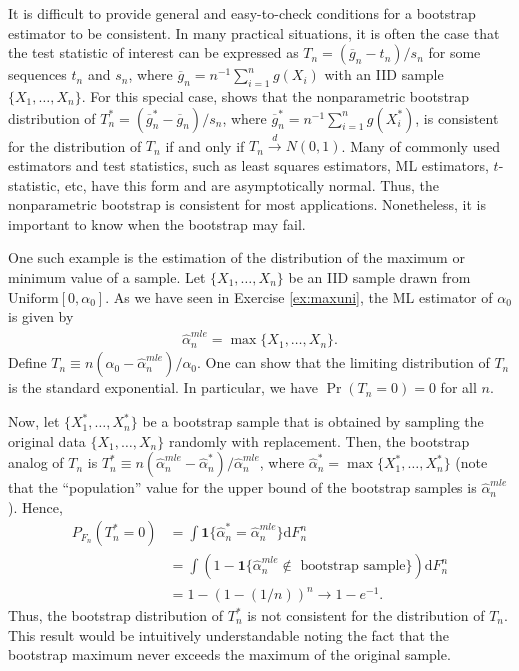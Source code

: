 \documentclass[10.5pt, A4paper, openany, uplatex]{book}
\newcommand{\mbf}{\mathbf}
\renewcommand{\hat}{\widehat}
\renewcommand{\bar}{\overline}
\numberwithin{equation}{section}
\begin{document}
It is difficult to provide general and easy-to-check conditions for a bootstrap estimator to be consistent.
In many practical situations, it is often the case that the test statistic of interest can be expressed as $T_n = (\bar g_n - t_n)/s_n$ for some sequences $t_n$ and $s_n$, where $\bar g_n = n^{-1}\sum_{i = 1}^n g(X_i)$ with an IID sample $\{X_1, \ldots, X_n\}$.
For this special case, \cite{mammen1992bootstrap} shows that the nonparametric bootstrap distribution of $T_n^* = (\bar g_n^* - \bar g_n)/s_n$, where $\bar g_n^* = n^{-1}\sum_{i = 1}^n g(X^*_i)$, is consistent for the distribution of $T_n$ if and only if $T_n \overset{d}{\to} N(0,1)$.
Many of commonly used estimators and test statistics, such as least squares estimators, ML estimators, $t$-statistic, etc, have this form and are asymptotically normal.
Thus, the nonparametric bootstrap is consistent for most applications.
Nonetheless, it is important to know when the bootstrap may fail.

One such example is the estimation of the distribution of the maximum or minimum value of a sample.
Let $\{X_1, \ldots, X_n\}$ be an IID sample drawn from $\mathrm{Uniform}[0, \alpha_0]$.
As we have seen in Exercise \ref{ex:maxuni}, the ML estimator of $\alpha_0$ is given by 
\begin{align*}
	\hat \alpha_n^{mle} = \max\{X_1, \ldots, X_n\}. 
\end{align*}
Define $T_n \equiv n(\alpha_0 - \hat \alpha_n^{mle})/\alpha_0$.
One can show that the limiting distribution of $T_n$ is the standard exponential.
In particular, we have $\Pr(T_n = 0) = 0$ for all $n$.

Now, let $\{X_1^*, \ldots, X_n^*\}$ be a bootstrap sample that is obtained by sampling the original data $\{X_1, \ldots, X_n\}$ randomly with replacement.
Then, the bootstrap analog of $T_n$ is $T_n^* \equiv n(\hat \alpha_n^{mle} - \hat \alpha_n^*)/\hat \alpha_n^{mle}$, where $\hat \alpha_n^* = \max\{X_1^*, \ldots, X_n^*\}$ (note that the ``population'' value for the upper bound of the bootstrap samples is $\hat \alpha_n^{mle}$).
Hence,
\begin{align*}
	P_{F_n}(T_n^* = 0)
	& = \int \mbf{1}\{\hat \alpha_n^* = \hat \alpha_n^{mle}\} \mathrm{d} F_n^n\\
	& = \int (1 - \mbf{1}\{\text{$\hat \alpha_n^{mle} \not\in $ bootstrap sample}\}) \mathrm{d} F_n^n\\
	& = 1 - (1 - (1/n))^n \to 1 - e^{-1}.
\end{align*}
Thus, the bootstrap distribution of $T_n^*$ is not consistent for the distribution of $T_n$.
This result would be intuitively understandable noting the fact that the bootstrap maximum never exceeds the maximum of the original sample.
\end{document}
